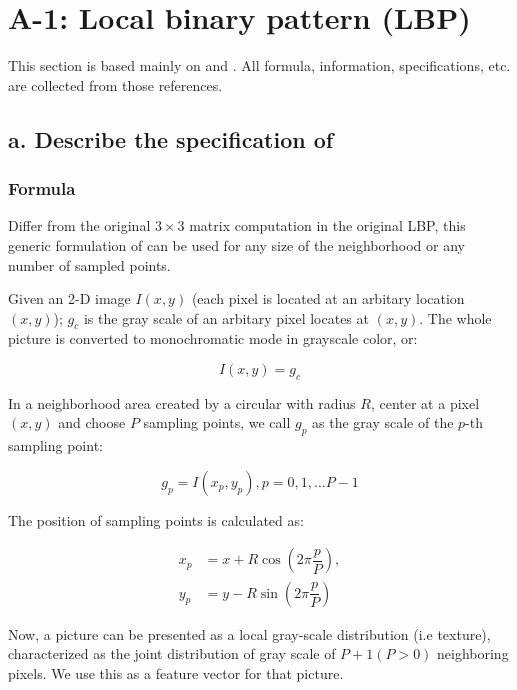 \section*{ \textbf{A-1: Local binary pattern (LBP) }}

This section is based mainly on \cite{Pietikainen2011a} and \cite{Pietikainen2011}. All formula, information, specifications, etc. are collected from those references.

\subsection*{a. Describe the specification of \LBPPR}

\subsubsection*{Formula}

Differ from the original $3 \times 3$ matrix computation in the original LBP, this generic formulation of \LBPPR can be used for any size of the neighborhood or any number of sampled points.

Given an 2-D image $I(x, y)$ (each pixel is located at an arbitary location $(x, y)$); $g_c$ is the gray scale of an arbitary pixel locates at $(x, y)$. The whole picture is converted to monochromatic mode in grayscale color, or:

\begin{equation*}
	 I(x, y) = g_c
\end{equation*}

In a neighborhood area created by a circular with radius $R$, center at a pixel $(x, y)$ and choose $P$ sampling points, we call $g_p$ as the gray scale of the $p$-th sampling point:

\begin{equation*}
	g_p = I(x_p, y_p), p = 0, 1, \ldots P - 1
\end{equation*}

The position of sampling points is calculated as:

\begin{align*}
	x_p &= x + R\cos{ (2\pi\dfrac{p}{P}) }, \\
	y_p &= y - R\sin{ (2\pi\dfrac{p}{P}) }
\end{align*}

Now, a picture can be presented as a local gray-scale distribution (i.e texture), characterized as the joint distribution of gray scale of $P + 1 (P > 0)$ neighboring pixels. We use this as a feature vector for that picture.

